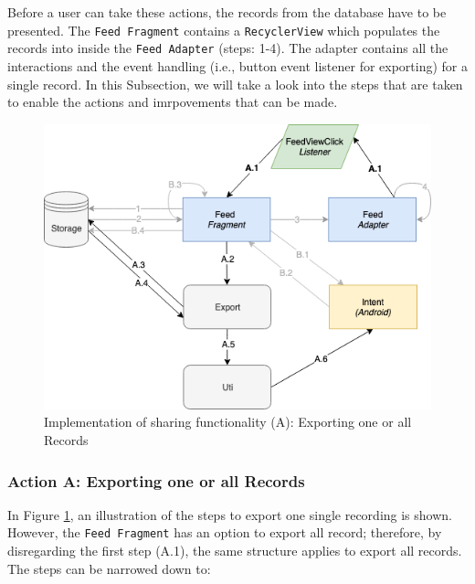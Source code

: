 Before a user can take these actions, the records from the database have to be presented. The \verb|Feed Fragment| contains a \verb|RecyclerView| which populates the records into inside the \verb|Feed Adapter| (steps: 1-4). The adapter contains all the interactions and the event handling (i.e., button event listener for exporting) for a single record. In this Subsection, we will take a look into the steps that are taken to enable the actions and imrpovements that can be made.

\begin{figure}
    \centering
    \includegraphics[scale=0.6]{images/Sharing_ImpA.png}
    \caption{Implementation of sharing functionality (A): Exporting one or all Records}
    \label{fig:impl_sharingA}
\end{figure}

\subsubsection{Action A: Exporting one or all Records}
In Figure \ref{fig:impl_sharingA}, an illustration of the steps to export one single recording is shown. However, the \verb|Feed Fragment| has an option to export all record; therefore, by disregarding the first step (A.1), the same structure applies to export all records. The steps can be narrowed down to: 

